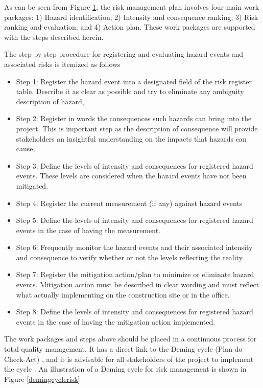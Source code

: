 \documentclass[10pt,halfline,a4paper]{ouparticle}
\begin{document}
\begin{figure}[!ht]
\label{riskmethodology} 
\end{figure}

As can be seen from Figure \ref{riskmethodology}, the risk management plan involves four main work packages: 1) Hazard identification; 2) Intensity and consequence ranking; 3) Risk ranking and evaluation; and 4) Action plan. These work packages are supported with the steps described herein.

The step by step procedure for registering and evaluating hazard events and associated risks is itemized as follows

\begin{itemize}
\item Step 1: Register the hazard event into a designated field of the risk register table. Describe it as clear as possible and try to eliminate any ambiguity description of hazard,
\item Step 2: Register in words the consequences such hazards can bring into the project. This is important step as the description of consequence will provide stakeholders an insightful understanding on the impacts that hazards can cause,
\item Step 3: Define the levels of intensity and consequences for registered hazard events. These levels are considered when the hazard events have not been mitigated. 
\item Step 4: Register the current measurement (if any) against hazard events
\item Step 5: Define the levels of intensity and consequences for registered hazard events in the case of having the measurement. 
\item Step 6: Frequently monitor the hazard events and their associated intensity and consequence to verify whether or not the levels reflecting the reality
\item Step 7: Register the mitigation action/plan to minimize or eliminate hazard events. Mitigation action must be described in clear wording and must reflect what actually implementing on the construction site or in the office.
\item Step 8: Define the levels of intensity and consequences for registered hazard events in the case of having the mitigation action implemented.
\end{itemize}

The work packages and steps above should be placed in a continuous process for total quality management. It has a direct link to the Deming cycle (Plan-do-Check-Act) \citep{Walton1986}, and it is advisable for all stakeholders of the project to implement the cycle . An illustration of a Deming cycle for risk management is shown in Figure \ref{demingcyclerisk}
\end{document}
